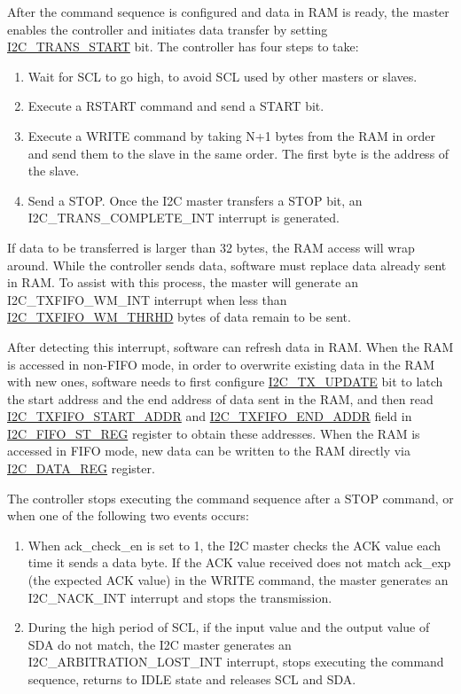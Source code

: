 \documentclass[main\_\_EN.tex]{subfiles}
\begin{document}
After the command sequence is configured and data in RAM is ready, the master enables the controller and initiates data transfer by setting \hyperref[fielddesc:I2CTRANSSTART]{I2C\_TRANS\_START} bit. The controller has four steps to take:

\begin{enumerate}
\item Wait for SCL to go high, to avoid SCL used by other masters or slaves.
\item Execute a RSTART command and send a START bit.
\item Execute a WRITE command by taking N+1 bytes from the RAM in order and send them to the slave in the same order. The first byte is the address of the slave.
\item Send a STOP. Once the I2C master transfers a STOP bit, an I2C\_TRANS\_COMPLETE\_INT interrupt is generated.
\end{enumerate}

If data to be transferred is larger than 32 bytes, the RAM access will wrap around. While the controller sends data, software must replace data already sent in RAM. To assist with this process, the master will generate an I2C\_TXFIFO\_WM\_INT interrupt when less than \hyperref[fielddesc:I2CTXFIFOWMTHRHD]{I2C\_TXFIFO\_WM\_THRHD} bytes of data remain to be sent.

After detecting this interrupt, software can refresh data in RAM. When the RAM is accessed in non-FIFO mode, in order to overwrite existing data in the RAM with new ones, software needs to first configure \hyperref[fielddesc:I2CTXUPDATE]{I2C\_TX\_UPDATE} bit to latch the start address and the end address of data sent in the RAM, and then read \hyperref[fielddesc:I2CTXFIFOSTARTADDR]{I2C\_TXFIFO\_START\_ADDR} and \hyperref[fielddesc:I2CTXFIFOENDADDR]{I2C\_TXFIFO\_END\_ADDR} field in \hyperref[regdesc:I2CFIFOSTREG]{I2C\_FIFO\_ST\_REG} register to obtain these addresses. When the RAM is accessed in FIFO mode, new data can be written to the RAM directly via \hyperref[regdesc:I2CDATAREG]{I2C\_DATA\_REG} register.

The controller stops executing the command sequence after a STOP command, or when one of the following two events occurs:

\begin{enumerate}
\item When ack\_check\_en is set to 1, the I2C master checks the ACK value each time it sends a data byte. If the ACK value received does not match ack\_exp (the expected ACK value) in the WRITE command, the master generates an I2C\_NACK\_INT interrupt and stops the transmission.

\item During the high period of SCL, if the input value and the output value of SDA do not match, the I2C master generates an I2C\_ARBITRATION\_LOST\_INT interrupt, stops executing the command sequence, returns to IDLE state and releases SCL and SDA.

\end{enumerate}
\end{document}
